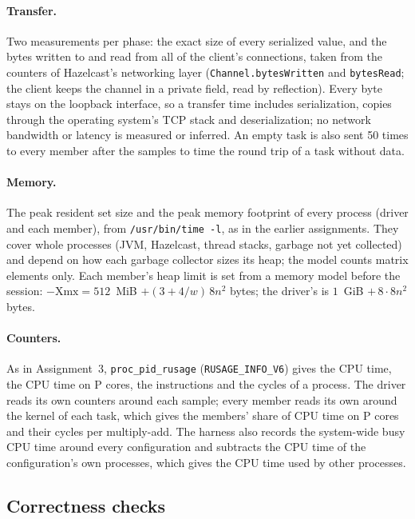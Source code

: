 \documentclass[11pt,a4paper]{article}
\begin{document}
\paragraph{Transfer.} Two measurements per phase: the exact size of every
serialized value, and the bytes written to and read from all of the client's
connections, taken from the counters of Hazelcast's networking layer
(\texttt{Channel.bytesWritten} and \texttt{bytesRead}; the client keeps the
channel in a private field, read by reflection). Every byte stays on the
loopback interface, so a transfer time includes serialization, copies through
the operating system's TCP stack and deserialization; no network bandwidth or
latency is measured or inferred. An empty task is also sent 50 times to every
member after the samples to time the round trip of a task without data.

\paragraph{Memory.} The peak resident set size and the peak memory footprint
of every process (driver and each member), from \texttt{/usr/bin/time -l}, as in
the earlier assignments. They cover whole processes (JVM, Hazelcast, thread
stacks, garbage not yet collected) and depend on how each garbage collector
sizes its heap; the model counts matrix elements only. Each member's heap limit
is set from a memory model before the session: $\mathrm{-Xmx}=512$~MiB
$+(3+4/w)\,8n^2$ bytes; the driver's is $1$~GiB $+\,8\cdot8n^2$ bytes.

\paragraph{Counters.} As in Assignment~3, \texttt{proc\_pid\_rusage}
(\texttt{RUSAGE\_INFO\_V6}) gives the CPU time, the CPU time on P cores, the
instructions and the cycles of a process. The driver reads its own counters
around each sample; every member reads its own around the kernel of each task,
which gives the members' share of CPU time on P cores and their cycles per
multiply-add. The harness also records the system-wide busy CPU time around
every configuration and subtracts the CPU time of the configuration's own
processes, which gives the CPU time used by other processes.

\subsection{Correctness checks}
\label{sec:correctness}
\end{document}
